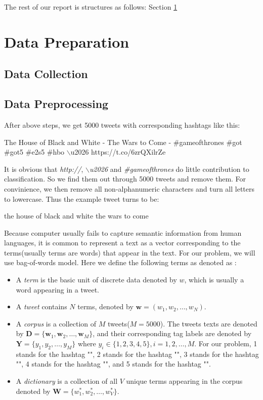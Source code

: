 \documentclass[letterpaper,11pt,twocolumn]{article}
\def\bfw{\mathbf w}
\def\bfW{\mathbf W}
\def\bfD{\mathbf D}
\def\bfY{\mathbf Y}
\begin{document}
The rest of our report is structures as follows: Section \ref{sec:data} 

\section{Data Preparation}
\label{sec:data}
\subsection{Data Collection}
\subsection{Data Preprocessing}
After above steps, we get 5000 tweets with corresponding hashtags like this:
\begin{framed}
The House of Black and White - The Wars to Come - \#gameofthrones \#got \#got5 \#e2s5  \#hbo $\backslash$u2026 https://t.co/6zrQXilrZe
\end{framed}
It is obvious that \emph{http://}, \emph{$\backslash$u2026} and \emph{\#gameofthrones} do little contribution to classification. So we find them out through 5000 tweets and remove them. For convinience, we then remove all non-alphanumeric characters and turn all letters to lowercase. Thus the example tweet turns to be:
\begin{framed}
the house of black and white the wars to come
\end{framed}
Because computer usually fails to capture semantic information from human languages, it is common to represent a text as a vector corresponding to the terms(usually terms are words) that appear in the text. For our problem, we will use bag-of-words model. Here we define the following terms as denoted as \cite{blei2003latent}:
\begin{itemize}
\item A \emph{term} is the basic unit of discrete data denoted by $w$, which is usually a word appearing in a tweet.
\item A \emph{tweet} contains $N$ terms, denoted by $\bfw = (w_1, w_2, \dots, w_N)$.
\item A \emph{corpus} is a collection of $M$ tweets($M=5000$). The tweets texts are denoted by $\bfD = \{\bfw_1, \bfw_2, \dots, \bfw_M\}$, and their corresponding tag labels are denoted by $\bfY = \{y_1, y_2, \dots, y_M\}$ where $y_i \in \{1, 2, 3, 4, 5\}, i = 1, 2, \dots, M$. For our problem, 1 stands for the hashtag "", 2 stands for the hashtag "", 3 stands for the hashtag "", 4 stands for the hashtag "", and 5 stands for the hashtag "".
\item A \emph{dictionary} is a collection of all $V$ unique terms appearing in the corpus denoted by $\bfW = \{w_1^*, w_2^*, \dots, w_V^*\}$.
\end{itemize}
\end{document}
